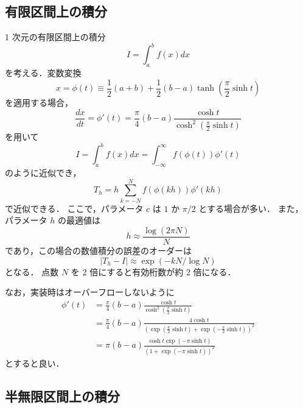 \subsection{有限区間上の積分}

1 次元の有限区間上の積分
\begin{equation}
    I = \int_{a}^{b} f(x) dx
\end{equation}
を考える．変数変換
\begin{equation}
    x = \phi(t) \equiv \frac{1}{2}(a + b) + \frac{1}{2}(b - a) \tanh \left(\frac{\pi}{2} \sinh{t}\right)
\end{equation}
を適用する場合，
\begin{equation}
    \frac{dx}{dt} = \phi'(t)
    = \frac{\pi}{4} (b - a) \frac{\cosh{t}}{\cosh^2 \left(\frac{\pi}{2} \sinh{t}\right)}
\end{equation}
を用いて
\begin{equation}
    I = \int_{a}^{b} f(x) dx
    = \int_{-\infty}^{\infty} f(\phi(t)) \phi'(t)
\end{equation}
のように近似でき，
\begin{equation}
    T_h = h \sum_{k = -N}^{N} f(\phi(kh)) \phi'(kh)
\end{equation}
で近似できる．
ここで，パラメータ $c$ は $1$ か $\pi/2$ とする場合が多い\cite[Section 4.5]{Press2007}．
また，パラメータ $h$ の最適値は
\begin{equation}
    h \approx \frac{\log(2 \pi N)}{N}
\end{equation}
であり，この場合の数値積分の誤差のオーダーは
\begin{equation}
    |T_h - I| \approx \exp(-kN / \log{N})
\end{equation}
となる\cite[Section 4.5]{Press2007}．
点数 $N$ を 2 倍にすると有効桁数が約 2 倍になる．

なお，実装時はオーバーフローしないように
\begin{align}
    \phi'(t)
     & = \frac{\pi}{4} (b - a) \frac{\cosh{t}}{\cosh^2 \left(\frac{\pi}{2} \sinh{t}\right)}                                              \\
     & = \frac{\pi}{4} (b - a) \frac{4 \cosh{t}}{(\exp\left(\frac{\pi}{2} \sinh{t}\right) + \exp\left(-\frac{\pi}{2} \sinh{t}\right))^2} \\
     & = \pi (b - a) \frac{\cosh{t} \exp(-\pi \sinh{t})}{(1 + \exp(-\pi \sinh{t}))^2}
\end{align}
とすると良い\cite[Section 4.5.2]{Press2007}．

\subsection{半無限区間上の積分}

